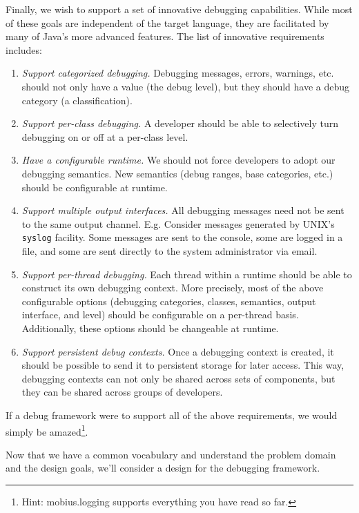 \documentclass{article}
\begin{document}
Finally, we wish to support a set of innovative debugging
capabilities.  While most of these goals are independent of the target
language, they are facilitated by many of Java's more advanced
features.  The list of innovative requirements includes:
\begin{enumerate}
\item \emph{Support categorized debugging.} Debugging messages,
  errors, warnings, etc. should not only have a value (the debug
  level), but they should have a debug category (a classification).
\item \emph{Support per-class debugging.} A developer should be able
  to selectively turn debugging on or off at a per-class level.
\item \emph{Have a configurable runtime.}  We should not force
  developers to adopt our debugging semantics.  New semantics (debug
  ranges, base categories, etc.) should be configurable at runtime.
\item \emph{Support multiple output interfaces.} All debugging
  messages need not be sent to the same output channel.  E.g. Consider
  messages generated by UNIX's \texttt{syslog} facility.  Some
  messages are sent to the console, some are logged in a file, and
  some are sent directly to the system administrator via email.
\item \emph{Support per-thread debugging.} Each thread within a
  runtime should be able to construct its own debugging context.  More
  precisely, most of the above configurable options (debugging
  categories, classes, semantics, output interface, and level) should
  be configurable on a per-thread basis.  Additionally, these options
  should be changeable at runtime.
\item \emph{Support persistent debug contexts.} Once a debugging
  context is created, it should be possible to send it to persistent
  storage for later access.  This way, debugging contexts can not only
  be shared across sets of components, but they can be shared across
  groups of developers.
\end{enumerate}

If a debug framework were to support all of the above requirements, we
would simply be amazed\footnote{Hint: mobius.logging supports everything you
  have read so far.}.

Now that we have a common vocabulary and understand the problem domain
and the design goals, we'll consider a design for the debugging
framework.

\end{document}
